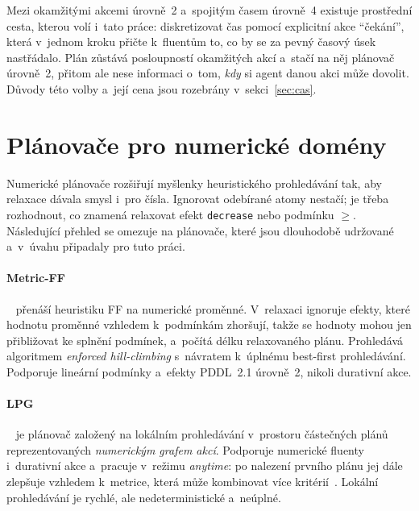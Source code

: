 Mezi okamžitými akcemi úrovně~2 a~spojitým časem úrovně~4 existuje prostřední cesta, kterou volí i~tato práce: diskretizovat čas pomocí explicitní akce \enquote{čekání}, která v~jednom kroku přičte k~fluentům to, co by se za pevný časový úsek nastřádalo. Plán zůstává posloupností okamžitých akcí a~stačí na něj plánovač úrovně~2, přitom ale nese informaci o~tom, \emph{kdy} si agent danou akci může dovolit. Důvody této volby a~její cena jsou rozebrány v~sekci~\ref{sec:cas}.

\section{Plánovače pro numerické domény}
\label{sec:planovace}

Numerické plánovače rozšiřují myšlenky heuristického prohledávání tak, aby relaxace dávala smysl i~pro čísla. Ignorovat odebírané atomy nestačí; je třeba rozhodnout, co znamená relaxovat efekt \texttt{decrease} nebo podmínku $\ge$. Následující přehled se omezuje na plánovače, které jsou dlouhodobě udržované a~v~úvahu připadaly pro tuto práci.

\paragraph{Metric-FF}~\cite{Hoffmann2003} přenáší heuristiku FF na numerické proměnné. V~relaxaci ignoruje efekty, které hodnotu proměnné vzhledem k~podmínkám zhoršují, takže se hodnoty mohou jen přibližovat ke splnění podmínek, a~počítá délku relaxovaného plánu. Prohledává algoritmem \emph{enforced hill-climbing} s~návratem k~úplnému best-first prohledávání. Podporuje lineární podmínky a~efekty PDDL~2.1 úrovně~2, nikoli durativní akce.

\paragraph{LPG}~\cite{Gerevini2003,Gerevini2008} je plánovač založený na lokálním prohledávání v~prostoru částečných plánů reprezentovaných \emph{numerickým grafem akcí}. Podporuje numerické fluenty i~durativní akce a~pracuje v~režimu \emph{anytime}: po nalezení prvního plánu jej dále zlepšuje vzhledem k~metrice, která může kombinovat více kritérií~\cite{Gerevini2008}. Lokální prohledávání je rychlé, ale nedeterministické a~neúplné.

